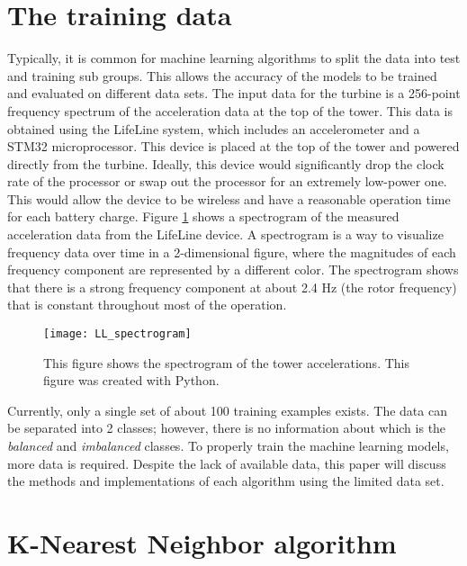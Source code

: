 \section{The training data}
Typically, it is common for machine learning algorithms to split the data into test and training sub groups.  This allows the accuracy of the models to be trained and evaluated on different data sets.  The input data for the turbine is a 256-point frequency spectrum of the acceleration data at the top of the tower.  This data is obtained using the LifeLine system, which includes an accelerometer and a STM32 microprocessor.  This device is placed at the top of the tower and powered directly from the turbine.  Ideally, this device would significantly drop the clock rate of the processor or swap out the processor for an extremely low-power one.  This would allow the device to be wireless and have a reasonable operation time for each battery charge.  Figure \ref{fig:LL_spectrogram} shows a spectrogram of the measured acceleration data from the LifeLine device.  A spectrogram is a way to visualize frequency data over time in a 2-dimensional figure, where the magnitudes of each frequency component are represented by a different color.  The spectrogram shows that there is a strong frequency component at about 2.4 Hz (the rotor frequency) that is constant throughout most of the operation.

\begin{figure}
	\centering
	\texttt{[image: LL\_spectrogram]}
	\decoRule
	\caption{This figure shows the spectrogram of the tower accelerations.  This figure was created with Python.}
	\label{fig:LL_spectrogram}
\end{figure}

Currently, only a single set of about 100 training examples exists.  The data can be separated into 2 classes; however, there is no information about which is the \textit{balanced} and \textit{imbalanced} classes.  To properly train the machine learning models, more data is required.  Despite the lack of available data, this paper will discuss the methods and implementations of each algorithm using the limited data set.


\section{K-Nearest Neighbor algorithm}
